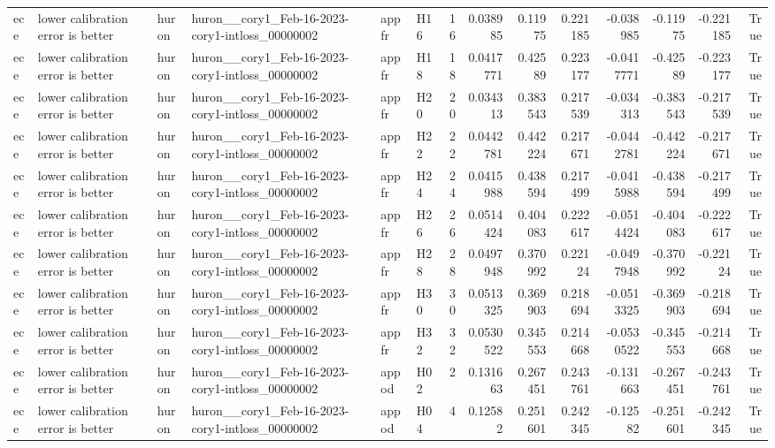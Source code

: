 \begin{longtable}{llllllrrrrrrrr}
ece & lower calibration error is better & huron & huron\_\_cory1\_Feb-16-2023-cory1-intloss\_00000002 & appfr & H16 & 16 & 0.038985 & 0.11975 & 0.221185 & -0.038985 & -0.11975 & -0.221185 & True \\
ece & lower calibration error is better & huron & huron\_\_cory1\_Feb-16-2023-cory1-intloss\_00000002 & appfr & H18 & 18 & 0.0417771 & 0.42589 & 0.223177 & -0.0417771 & -0.42589 & -0.223177 & True \\
ece & lower calibration error is better & huron & huron\_\_cory1\_Feb-16-2023-cory1-intloss\_00000002 & appfr & H20 & 20 & 0.034313 & 0.383543 & 0.217539 & -0.034313 & -0.383543 & -0.217539 & True \\
ece & lower calibration error is better & huron & huron\_\_cory1\_Feb-16-2023-cory1-intloss\_00000002 & appfr & H22 & 22 & 0.0442781 & 0.442224 & 0.217671 & -0.0442781 & -0.442224 & -0.217671 & True \\
ece & lower calibration error is better & huron & huron\_\_cory1\_Feb-16-2023-cory1-intloss\_00000002 & appfr & H24 & 24 & 0.0415988 & 0.438594 & 0.217499 & -0.0415988 & -0.438594 & -0.217499 & True \\
ece & lower calibration error is better & huron & huron\_\_cory1\_Feb-16-2023-cory1-intloss\_00000002 & appfr & H26 & 26 & 0.0514424 & 0.404083 & 0.222617 & -0.0514424 & -0.404083 & -0.222617 & True \\
ece & lower calibration error is better & huron & huron\_\_cory1\_Feb-16-2023-cory1-intloss\_00000002 & appfr & H28 & 28 & 0.0497948 & 0.370992 & 0.22124 & -0.0497948 & -0.370992 & -0.22124 & True \\
ece & lower calibration error is better & huron & huron\_\_cory1\_Feb-16-2023-cory1-intloss\_00000002 & appfr & H30 & 30 & 0.0513325 & 0.369903 & 0.218694 & -0.0513325 & -0.369903 & -0.218694 & True \\
ece & lower calibration error is better & huron & huron\_\_cory1\_Feb-16-2023-cory1-intloss\_00000002 & appfr & H32 & 32 & 0.0530522 & 0.345553 & 0.214668 & -0.0530522 & -0.345553 & -0.214668 & True \\
ece & lower calibration error is better & huron & huron\_\_cory1\_Feb-16-2023-cory1-intloss\_00000002 & appod & H02 & 2 & 0.131663 & 0.267451 & 0.243761 & -0.131663 & -0.267451 & -0.243761 & True \\
ece & lower calibration error is better & huron & huron\_\_cory1\_Feb-16-2023-cory1-intloss\_00000002 & appod & H04 & 4 & 0.12582 & 0.251601 & 0.242345 & -0.12582 & -0.251601 & -0.242345 & True \\

\end{longtable}
